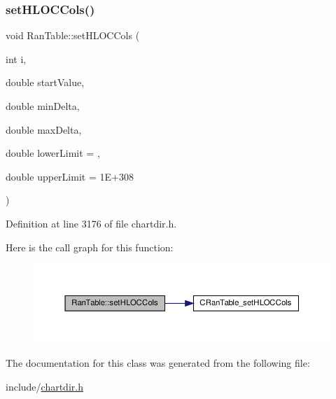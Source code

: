 \subsubsection{\texorpdfstring{set\+H\+L\+O\+C\+Cols()}{setHLOCCols()}}
{\footnotesize\ttfamily void Ran\+Table\+::set\+H\+L\+O\+C\+Cols (\begin{DoxyParamCaption}\item[{int}]{i,  }\item[{double}]{start\+Value,  }\item[{double}]{min\+Delta,  }\item[{double}]{max\+Delta,  }\item[{double}]{lower\+Limit = {},  }\item[{double}]{upper\+Limit = {\ttfamily 1E+308} }\end{DoxyParamCaption})\hspace{0.3cm}{\ttfamily [inline]}}



Definition at line 3176 of file chartdir.\+h.

Here is the call graph for this function\+:
\nopagebreak
\begin{figure}[H]
\begin{center}
\leavevmode
\includegraphics[width=350pt]{class_ran_table_a7df8569529d0bda58899803aa8972f38_cgraph}
\end{center}
\end{figure}


The documentation for this class was generated from the following file\+:\begin{DoxyCompactItemize}
\item 
include/\hyperlink{chartdir_8h}{chartdir.\+h}\end{DoxyCompactItemize}

